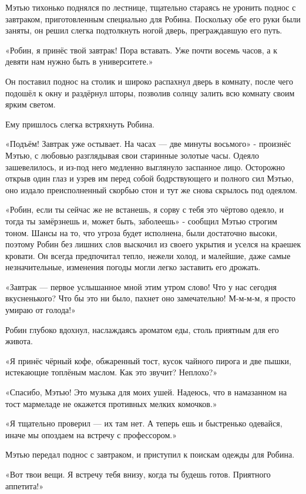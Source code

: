 \documentclass[a4paper,12pt]{book}
\begin{document}
Мэтью тихонько поднялся по лестнице, тщательно стараясь не уронить поднос с завтраком, приготовленным специально для Робина. Поскольку обе его руки были заняты, он решил слегка подтолкнуть ногой дверь, преграждавшую его путь.
\par
«Робин, я принёс твой завтрак! Пора вставать. Уже почти восемь часов, а к девяти нам нужно быть в университете.»
\par
Он поставил поднос на столик и широко распахнул дверь в комнату, после чего подошёл к окну и раздёрнул шторы, позволив солнцу залить всю комнату своим ярким светом.
\par
Ему пришлось слегка встряхнуть Робина.
\par
«Подъём! Завтрак уже остывает. На часах — две минуты восьмого» - произнёс Мэтью, с любовью разглядывая свои старинные золотые часы. Одеяло зашевелилось, и из-под него медленно выглянуло заспанное лицо. Осторожно открыв один глаз и узрев им перед собой бодрствующего и полного сил Мэтью, оно издало преисполненный скорбью стон и тут же снова скрылось под одеялом.
\par
«Робин, если ты сейчас же не встанешь, я сорву с тебя это чёртово одеяло, и тогда ты замёрзнешь и, может быть, заболеешь» - сообщил Мэтью строгим тоном. Шансы на то, что угроза будет исполнена, были достаточно высоки, поэтому Робин без лишних слов выскочил из своего укрытия и уселся на краешек кровати. Он всегда предпочитал тепло, нежели холод, и малейшие, даже самые незначительные, изменения погоды могли легко заставить его дрожать.
\par
«Завтрак — первое услышанное мной этим утром слово! Что у нас сегодня вкусненького? Что бы это ни было, пахнет оно замечательно! М-м-м-м, я просто умираю от голода!»
\par
Робин глубоко вдохнул, наслаждаясь ароматом еды, столь приятным для его живота.
\par
«Я принёс чёрный кофе, обжаренный тост, кусок чайного пирога и две пышки, истекающие топлёным маслом. Как это звучит? Неплохо?»
\par
«Спасибо, Мэтью! Это музыка для моих ушей. Надеюсь, что в намазанном на тост мармеладе не окажется противных мелких комочков.»
\par
«Я тщательно проверил — их там нет. А теперь ешь и быстренько одевайся, иначе мы опоздаем на встречу с профессором.»
\par
Мэтью передал поднос с завтраком, и приступил к поискам одежды для Робина.
\par
«Вот твои вещи. Я встречу тебя внизу, когда ты будешь готов. Приятного аппетита!»
\end{document}
